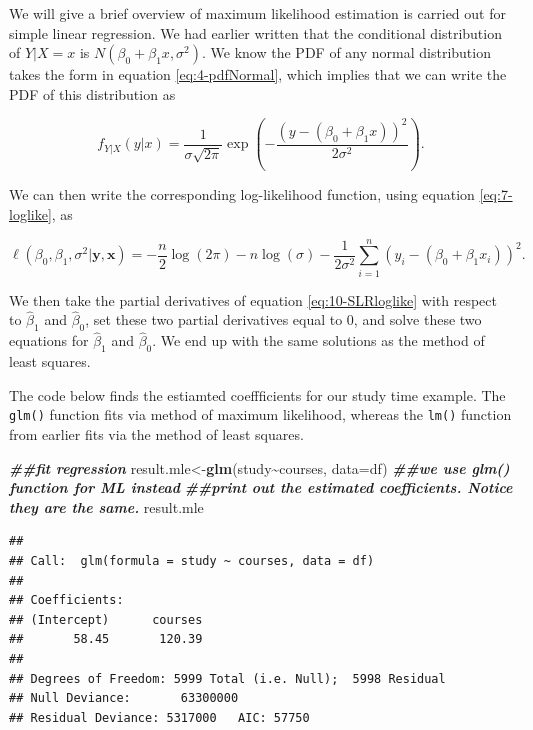 \documentclass[
]{book}
\newenvironment{Shaded}{\begin{snugshade}}{\end{snugshade}}
\newcommand{\AttributeTok}[1]{\textcolor[rgb]{0.13,0.29,0.53}{#1}}
\newcommand{\DocumentationTok}[1]{\textcolor[rgb]{0.56,0.35,0.01}{\textbf{\textit{#1}}}}
\newcommand{\FunctionTok}[1]{\textcolor[rgb]{0.13,0.29,0.53}{\textbf{#1}}}
\newcommand{\NormalTok}[1]{#1}
\newcommand{\OtherTok}[1]{\textcolor[rgb]{0.56,0.35,0.01}{#1}}
\newcommand{\SpecialCharTok}[1]{\textcolor[rgb]{0.81,0.36,0.00}{\textbf{#1}}}
\begin{document}
We will give a brief overview of maximum likelihood estimation is carried out for simple linear regression. We had earlier written that the conditional distribution of \(Y|X=x\) is \(N(\beta_0+\beta_{1} x, \sigma^2)\). We know the PDF of any normal distribution takes the form in equation \eqref{eq:4-pdfNormal}, which implies that we can write the PDF of this distribution as

\begin{equation} 
f_{Y|X}(y|x) = \frac{1}{\sigma \sqrt{2 \pi}} \exp \left(-\frac{(y - (\beta_0+\beta_{1} x))^2}{2 \sigma^2} \right).
\label{eq:10-SLRpdf}
\end{equation}

We can then write the corresponding log-likelihood function, using equation \eqref{eq:7-loglike}, as

\begin{equation}
\ell(\beta_0, \beta_1, \sigma^2 | \boldsymbol{y}, \boldsymbol{x}) = -\frac{n}{2} \log(2\pi) - n \log(\sigma) - \frac{1}{2 \sigma^2} \sum_{i=1}^n \left(y_i - (\beta_0 + \beta_1 x_i) \right)^2.
\label{eq:10-SLRloglike}
\end{equation}

We then take the partial derivatives of equation \eqref{eq:10-SLRloglike} with respect to \(\hat{\beta}_1\) and \(\hat{\beta}_0\), set these two partial derivatives equal to 0, and solve these two equations for \(\hat{\beta}_1\) and \(\hat{\beta}_0\). We end up with the same solutions as the method of least squares.

The code below finds the estiamted coeffficients for our study time example. The \texttt{glm()} function fits via method of maximum likelihood, whereas the \texttt{lm()} function from earlier fits via the method of least squares.

\begin{Shaded}
\begin{Highlighting}[]
\DocumentationTok{\#\#fit regression}
\NormalTok{result.mle}\OtherTok{\textless{}{-}}\FunctionTok{glm}\NormalTok{(study}\SpecialCharTok{\textasciitilde{}}\NormalTok{courses, }\AttributeTok{data=}\NormalTok{df) }\DocumentationTok{\#\#we use glm() function for ML instead}
\DocumentationTok{\#\#print out the estimated coefficients. Notice they are the same. }
\NormalTok{result.mle}
\end{Highlighting}
\end{Shaded}

\begin{verbatim}
## 
## Call:  glm(formula = study ~ courses, data = df)
## 
## Coefficients:
## (Intercept)      courses  
##       58.45       120.39  
## 
## Degrees of Freedom: 5999 Total (i.e. Null);  5998 Residual
## Null Deviance:       63300000 
## Residual Deviance: 5317000   AIC: 57750
\end{verbatim}
\end{document}
